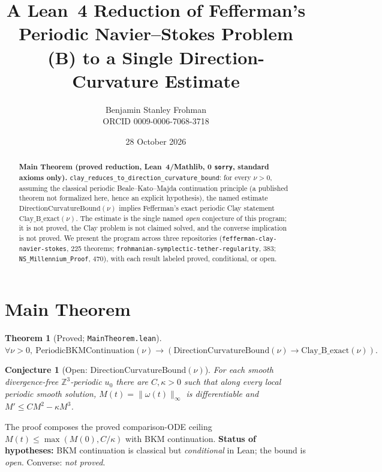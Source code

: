 \documentclass[11pt]{article}
\title{A Lean~4 Reduction of Fefferman's Periodic Navier--Stokes Problem (B) to a Single Direction-Curvature Estimate}
\author{Benjamin Stanley Frohman\\ORCID 0009-0006-7068-3718}
\date{28 October 2026}
\newtheorem{theorem}{Theorem}\newtheorem{conjecture}{Conjecture}
\begin{document}
\maketitle
\begin{abstract}
\textbf{Main Theorem (proved reduction, Lean~4/Mathlib, 0 \texttt{sorry}, standard axioms only).} \texttt{clay\_reduces\_to\_direction\_curvature\_bound}: for every $\nu>0$, assuming the classical periodic Beale--Kato--Majda continuation principle (a published theorem not formalized here, hence an explicit hypothesis), the named estimate $\mathrm{DirectionCurvatureBound}(\nu)$ implies Fefferman's exact periodic Clay statement $\mathrm{Clay\_B\_exact}(\nu)$. The estimate is the single named \emph{open} conjecture of this program; it is not proved, the Clay problem is not claimed solved, and the converse implication is not proved. We present the program across three repositories (\texttt{fefferman-clay-navier-stokes}, 225 theorems; \texttt{frohmanian-symplectic-tether-regularity}, 383; \texttt{NS\_Millennium\_Proof}, 470), with each result labeled proved, conditional, or open.
\end{abstract}
\section{Main Theorem}
\begin{theorem}[Proved; \texttt{MainTheorem.lean}]
$\forall\nu>0,\ \mathrm{PeriodicBKMContinuation}(\nu)\to(\mathrm{DirectionCurvatureBound}(\nu)\to\mathrm{Clay\_B\_exact}(\nu)).$
\end{theorem}
\begin{conjecture}[Open: $\mathrm{DirectionCurvatureBound}(\nu)$]
For each smooth divergence-free $\mathbb{Z}^3$-periodic $u_0$ there are $C,\kappa>0$ such that along every local periodic smooth solution, $M(t)=\|\omega(t)\|_\infty$ is differentiable and $M'\le C M^2-\kappa M^3$.
\end{conjecture}
The proof composes the proved comparison-ODE ceiling $M(t)\le\max(M(0),C/\kappa)$ with BKM continuation. \textbf{Status of hypotheses:} BKM continuation is classical but \emph{conditional} in Lean; the bound is \emph{open}. Converse: \emph{not proved}.
\end{document}
